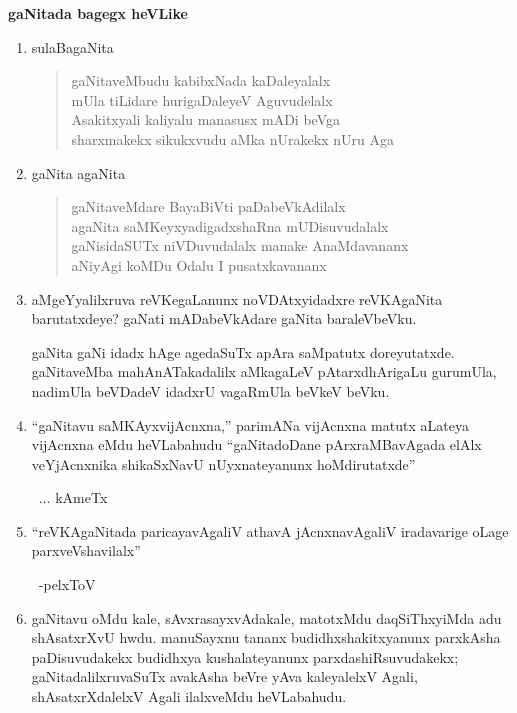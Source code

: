\begin{center}
{\bf gaNitada bagegx heVLike} 
\end{center}
\begin{enumerate}[\rm 1)]
\item sulaBagaNita
\begin{center} 
\begin{verse}
gaNitaveMbudu kabibxNada kaDaleyalalx\\
mUla tiLidare hurigaDaleyeV Aguvudelalx\\
Asakitxyali kaliyalu manasusx mADi beVga\\
sharxmakekx sikukxvudu aMka nUrakekx nUru Aga
\end{verse}
\end{center}

\item gaNita agaNita
\begin{center} 
\begin{verse}
gaNitaveMdare BayaBiVti paDabeVkAdilalx\\
agaNita saMKeyxyadigadxshaRna mUDisuvudalalx\\
gaNisidaSUTx niVDuvudalalx manake AnaMdavananx\\
aNiyAgi koMDu Odalu I pusatxkavananx
\end{verse}
\end{center}

\item aMgeYyalilxruva reVKegaLanunx noVDAtxyidadxre reVKAgaNita barutatxdeye? gaNati mADabeVkAdare gaNita baraleVbeVku.

gaNita gaNi idadx hAge agedaSuTx apAra saMpatutx doreyutatxde. gaNitaveMba mahAnATakadalilx aMkagaLeV pAtarxdhArigaLu gurumUla, nadimUla beVDadeV idadxrU vagaRmUla beVkeV beVku.

\item  ``gaNitavu saMKAyxvijAcnxna,'' parimANa vijAcnxna matutx aLateya vijAcnxna eMdu heVLabahudu ``gaNitadoDane pArxraMBavAgada elAlx veYjAcnxnika shikaSxNavU nUyxnateyanunx hoMdirutatxde''

~\hfill $\ldots$  kAmeTx

\item ``reVKAgaNitada paricayavAgaliV athavA jAcnxnavAgaliV iradavarige oLage parxveVshavilalx''

~\hfill -pelxToV

\item gaNitavu oMdu kale, sAvxrasayxvAdakale, matotxMdu daqSiThxyiMda adu shAsatxrXvU hwdu. manuSayxnu tananx budidhxshakitxyanunx parxkAsha paDisuvudakekx budidhxya kushalate\-yanunx parxdashiRsuvudakekx; gaNitadalilxruvaSuTx avakAsha beVre yAva kaleyalelxV Agali, shAsatxrXdalelxV Agali ilalxveMdu heVLabahudu.


\end{enumerate}
